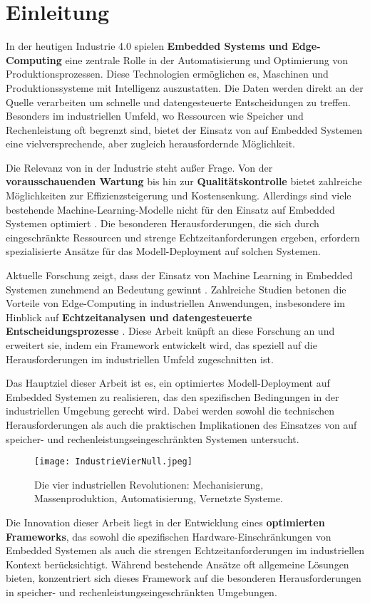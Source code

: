 \chapter{Einleitung}
\label{chap:einleitung}

In der heutigen Industrie 4.0 spielen \textbf{Embedded Systems und Edge-Computing} eine zentrale Rolle in der 
Automatisierung und Optimierung von Produktionsprozessen. Diese Technologien ermöglichen es, Maschinen 
und Produktionssysteme mit Intelligenz auszustatten. Die Daten werden direkt an der Quelle verarbeiten 
um schnelle und datengesteuerte Entscheidungen zu treffen. Besonders im industriellen Umfeld, wo Ressourcen 
wie Speicher und Rechenleistung oft begrenzt sind, bietet der Einsatz von \ML auf Embedded Systemen 
eine vielversprechende, aber zugleich herausfordernde Möglichkeit.

Die Relevanz von \ML in der Industrie steht außer Frage. Von der \textbf{vorausschauenden Wartung} \cite{inbook} 
bis hin zur \textbf{Qualitätskontrolle} \cite{phdthesis} bietet \ML zahlreiche Möglichkeiten zur Effizienzsteigerung und 
Kostensenkung. Allerdings sind viele bestehende Machine-Learning-Modelle nicht für den Einsatz auf Embedded Systemen 
optimiert \cite{article}. Die besonderen Herausforderungen, die sich durch eingeschränkte Ressourcen und strenge 
Echtzeitanforderungen ergeben, erfordern spezialisierte Ansätze für das Modell-Deployment auf solchen 
Systemen.

Aktuelle Forschung zeigt, dass der Einsatz von Machine Learning in Embedded Systemen zunehmend an 
Bedeutung gewinnt \cite{s23042131}. Zahlreiche Studien betonen die Vorteile von Edge-Computing in 
industriellen Anwendungen, insbesondere im Hinblick auf \textbf{Echtzeitanalysen und datengesteuerte 
Entscheidungsprozesse} \cite{10212294}. Diese Arbeit knüpft an diese Forschung an und 
erweitert sie, indem ein Framework entwickelt wird, das speziell auf die Herausforderungen im 
industriellen Umfeld zugeschnitten ist.

Das Hauptziel dieser Arbeit ist es, ein optimiertes Modell-Deployment auf Embedded Systemen zu 
realisieren, das den spezifischen Bedingungen in der industriellen Umgebung gerecht wird. Dabei 
werden sowohl die technischen Herausforderungen als auch die praktischen Implikationen des Einsatzes 
von \ML auf speicher- und rechenleistungseingeschränkten Systemen untersucht.
\begin{figure}[h] 
    \centering
    \texttt{[image: IndustrieVierNull.jpeg]} 
    \caption{Die vier industriellen Revolutionen: Mechanisierung, Massenproduktion, Automatisierung, Vernetzte Systeme.}
    \label{fig:industrie_vier_null}
\end{figure}
Die Innovation dieser Arbeit liegt in der Entwicklung eines \textbf{optimierten Frameworks}, das sowohl die 
spezifischen Hardware-Einschränkungen von Embedded Systemen als auch die strengen Echtzeitanforderungen 
im industriellen Kontext berücksichtigt. Während bestehende Ansätze oft allgemeine Lösungen bieten, 
konzentriert sich dieses Framework auf die besonderen Herausforderungen in speicher- und 
rechenleistungseingeschränkten Umgebungen.


